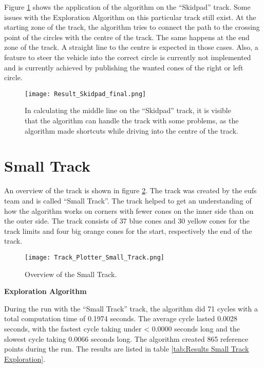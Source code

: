 Figure \ref{fig:Result Skidpad Final} shows the application of the algorithm on the ``Skidpad'' track. Some issues with the Exploration Algorithm on this particular track still exist. At the starting zone of the track, the algorithm tries to connect the path to the crossing point of the circles with the centre of the track. The same happens at the end zone of the track. A straight line to the centre is expected in those cases. Also, a feature to steer the vehicle into the correct circle is currently not implemented and is currently achieved by publishing the wanted cones of the right or left circle.
\begin{figure}[H]
    \centering
    \texttt{[image: Result\_Skidpad\_final.png]}
    \caption{In calculating the middle line on the ``Skidpad'' track, it is visible that the algorithm can handle the track with some problems, as the algorithm made shortcuts while driving into the centre of the track.}
    \label{fig:Result Skidpad Final}
\end{figure}

\pagebreak

\section{Small Track} \label{sec:Results Small Track}
An overview of the track is shown in figure \ref{fig:Results Small Track Initial}. The track was created by the \acrshort{eufs} team and is called ``Small Track''. \cite{eufs_sim_gitlab} The track helped to get an understanding of how the algorithm works on corners with fewer cones on the inner side than on the outer side. The track consists of 37 blue cones and 30 yellow cones for the track limits and four big orange cones for the start, respectively the end of the track.
\begin{figure}[H]
    \centering
    \texttt{[image: Track\_Plotter\_Small\_Track.png]}
    \caption{Overview of the Small Track.}
    \label{fig:Results Small Track Initial}
\end{figure}

\textbf{Exploration Algorithm}

During the run with the ``Small Track'' track, the algorithm did 71 cycles with a total computation time of 0.1974 seconds. The average cycle lasted 0.0028 seconds, with the fastest cycle taking under < 0.0000 seconds long and the slowest cycle taking 0.0066 seconds long. The algorithm created 865 reference points during the run. The results are listed in table \ref{tab:Results Small Track Exploration}.

